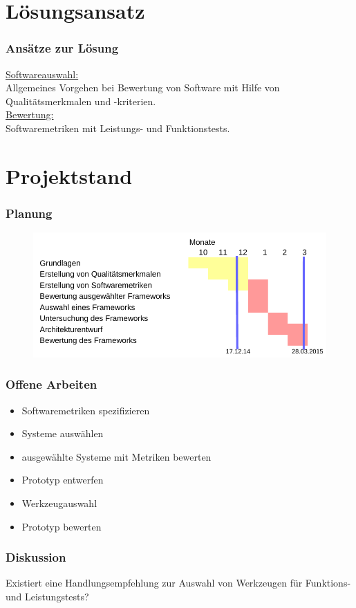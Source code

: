\documentclass{beamer}
\begin{document}
\section{Lösungsansatz}


\begin{frame}\frametitle{Ansätze zur Lösung}
\underline{Softwareauswahl:}\\
Allgemeines Vorgehen bei Bewertung von Software mit Hilfe von Qualitätsmerkmalen und -kriterien.\\
\vspace{\baselineskip}
\underline{Bewertung:}\\
Softwaremetriken mit Leistungs- und Funktionstests.
\end{frame}
% 

\section{Projektstand}
\begin{frame}\frametitle{Planung}
\begin{figure}[htb]
  \begin{center}
    \includegraphics[width=1\hsize]{Plan_cropped.pdf}
  \end{center}
\end{figure}
\end{frame}


\begin{frame}\frametitle{Offene Arbeiten}
\begin{itemize}
\item Softwaremetriken spezifizieren
\item Systeme auswählen
\item ausgewählte Systeme mit Metriken bewerten
\item Prototyp entwerfen
\item Werkzeugauswahl
\item Prototyp bewerten
\end{itemize}
\end{frame}

\begin{frame}\frametitle{Diskussion}
Existiert eine Handlungsempfehlung zur Auswahl von Werkzeugen für Funktions- und Leistungstests?
\vspace{\baselineskip}

\end{frame}
\end{document}

